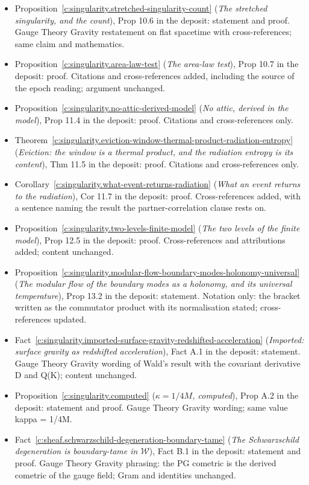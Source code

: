 \documentclass[11pt]{article}
\theoremstyle{definition}
\theoremstyle{plain}
\providecommand{\shW}{}\renewcommand{\shW}{\mathcal{W}}
\begin{document}
\begin{itemize}
\item Proposition~\ref{c:singularity.stretched-singularity-count} (\emph{The stretched singularity, and the count}), Prop 10.6 in the deposit: statement and proof. Gauge Theory Gravity restatement on flat spacetime with cross-references; same claim and mathematics.
\item Proposition~\ref{c:singularity.area-law-test} (\emph{The area-law test}), Prop 10.7 in the deposit: proof. Citations and cross-references added, including the source of the epoch reading; argument unchanged.
\item Proposition~\ref{c:singularity.no-attic-derived-model} (\emph{No attic, derived in the model}), Prop 11.4 in the deposit: proof. Citations and cross-references only.
\item Theorem~\ref{c:singularity.eviction-window-thermal-product-radiation-entropy} (\emph{Eviction: the window is a thermal product, and the radiation entropy is its content}), Thm 11.5 in the deposit: proof. Citations and cross-references only.
\item Corollary~\ref{c:singularity.what-event-returns-radiation} (\emph{What an event returns to the radiation}), Cor 11.7 in the deposit: proof. Cross-references added, with a sentence naming the result the partner-correlation clause rests on.
\item Proposition~\ref{c:singularity.two-levels-finite-model} (\emph{The two levels of the finite model}), Prop 12.5 in the deposit: proof. Cross-references and attributions added; content unchanged.
\item Proposition~\ref{c:singularity.modular-flow-boundary-modes-holonomy-universal} (\emph{The modular flow of the boundary modes as a holonomy, and its universal temperature}), Prop 13.2 in the deposit: statement. Notation only: the bracket written as the commutator product with its normalisation stated; cross-references updated.
\item Fact~\ref{c:singularity.imported-surface-gravity-redshifted-acceleration} (\emph{Imported: surface gravity as redshifted acceleration}), Fact A.1 in the deposit: statement. Gauge Theory Gravity wording of Wald's result with the covariant derivative D and Q(K); content unchanged.
\item Proposition~\ref{c:singularity.computed} (\emph{$\kappa = 1/4M$, computed}), Prop A.2 in the deposit: statement and proof. Gauge Theory Gravity wording; same value kappa = 1/4M.
\item Fact~\ref{c:sheaf.schwarzschild-degeneration-boundary-tame} (\emph{The Schwarzschild degeneration is boundary-tame in $\shW$}), Fact B.1 in the deposit: statement and proof. Gauge Theory Gravity phrasing: the PG cometric is the derived cometric of the gauge field; Gram and identities unchanged.
\end{itemize}
\end{document}
